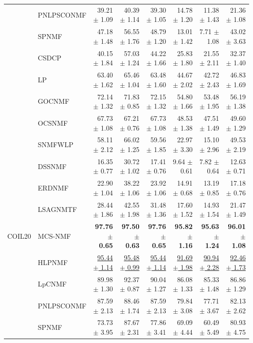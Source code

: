 \begin{landscape}
\begin{longtable}{llrrrrrr}
 & PNLPSCONMF & 39.21 $\pm$ 1.09 & 40.39 $\pm$ 1.14 & 39.30 $\pm$ 1.05 & 14.78 $\pm$ 1.20 & 11.38 $\pm$ 1.43 & 21.36 $\pm$ 1.08 \\
 & SPNMF & 47.18 $\pm$ 1.48 & 56.55 $\pm$ 1.76 & 48.79 $\pm$ 1.20 & 13.01 $\pm$ 1.42 & 7.71 $\pm$ 1.08 & 43.02 $\pm$ 3.63 \\
 & CSDCP & 40.15 $\pm$ 1.84 & 57.03 $\pm$ 1.24 & 44.22 $\pm$ 1.66 & 25.83 $\pm$ 1.80 & 21.55 $\pm$ 2.11 & 32.37 $\pm$ 1.40 \\
 & LP & 63.40 $\pm$ 1.62 & 65.46 $\pm$ 1.04 & 63.48 $\pm$ 1.60 & 44.67 $\pm$ 2.02 & 42.72 $\pm$ 2.43 & 46.83 $\pm$ 1.69 \\
 & GOCNMF & 72.14 $\pm$ 1.32 & 71.83 $\pm$ 0.85 & 72.15 $\pm$ 1.32 & 54.80 $\pm$ 1.66 & 53.48 $\pm$ 1.95 & 56.19 $\pm$ 1.38 \\
 & OCSNMF & 67.73 $\pm$ 1.08 & 67.21 $\pm$ 0.76 & 67.73 $\pm$ 1.08 & 48.53 $\pm$ 1.38 & 47.51 $\pm$ 1.49 & 49.60 $\pm$ 1.29 \\
 & SNMFWLP & 58.11 $\pm$ 2.12 & 66.02 $\pm$ 1.25 & 59.56 $\pm$ 1.85 & 22.97 $\pm$ 3.30 & 15.10 $\pm$ 2.96 & 49.53 $\pm$ 2.19 \\
 & DSSNMF & 16.35 $\pm$ 0.77 & 30.72 $\pm$ 1.02 & 17.41 $\pm$ 0.76 & 9.64 $\pm$ 0.61 & 7.82 $\pm$ 0.64 & 12.63 $\pm$ 0.71 \\
 & ERDNMF & 22.90 $\pm$ 1.04 & 38.22 $\pm$ 1.06 & 23.92 $\pm$ 1.06 & 14.91 $\pm$ 0.68 & 13.19 $\pm$ 0.85 & 17.18 $\pm$ 0.76 \\
 & LSAGNMTF & 28.44 $\pm$ 1.86 & 42.55 $\pm$ 1.98 & 31.48 $\pm$ 1.36 & 17.60 $\pm$ 1.52 & 14.93 $\pm$ 1.54 & 21.47 $\pm$ 1.49 \\
\midrule
COIL20 & MCS-NMF & \textbf{97.76 $\pm$ 0.65} & \textbf{97.50 $\pm$ 0.63} & \textbf{97.76 $\pm$ 0.65} & \textbf{95.82 $\pm$ 1.16} & \textbf{95.63 $\pm$ 1.24} & \textbf{96.01 $\pm$ 1.08} \\
 & HLPNMF & \underline{95.44 $\pm$ 1.14} & \underline{95.48 $\pm$ 0.99} & \underline{95.44 $\pm$ 1.14} & \underline{91.69 $\pm$ 1.98} & \underline{90.94 $\pm$ 2.28} & \underline{92.46 $\pm$ 1.73} \\
 & LpCNMF & 89.98 $\pm$ 1.30 & 92.37 $\pm$ 0.87 & 90.04 $\pm$ 1.27 & 86.08 $\pm$ 1.33 & 85.33 $\pm$ 1.48 & 86.86 $\pm$ 1.29 \\
 & PNLPSCONMF & 87.59 $\pm$ 2.13 & 88.46 $\pm$ 1.74 & 87.59 $\pm$ 2.13 & 79.84 $\pm$ 3.08 & 77.71 $\pm$ 3.67 & 82.13 $\pm$ 2.62 \\
 & SPNMF & 73.73 $\pm$ 3.95 & 87.67 $\pm$ 2.31 & 77.86 $\pm$ 3.41 & 69.09 $\pm$ 4.44 & 60.49 $\pm$ 5.49 & 80.93 $\pm$ 4.75 \\

\end{longtable}
\end{landscape}
